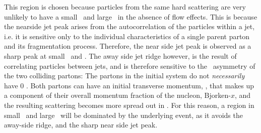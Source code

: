 This region is chosen because particles from the same hard scattering are very unlikely to have a small \deltaphi~and large \deltaeta~in the absence of flow effects. This is because the nearside jet peak arises from the autocorrelation of the particles within a jet, i.e. it is sensitive only to the individual characteristics of a single parent parton and its fragmentation process. Therefore, the near side jet peak is observed as a sharp peak at small \deltaphi~and \deltaeta. The away side jet ridge however, is the result of correlating particles between jets, and is therefore sensitive to the \kt~asymmetry of the two colliding partons: The partons in the initial system  do not \textit{necessarily} have 0 \pt. Both partons can have an initial transverse momentum, \kt, that makes up a component of their overall momentum fraction of the nucleon, Bjorken-$x$, and the resulting scattering becomes more spread out in \deltaeta. For this reason, a region in small \deltaphi~and large \deltaeta~will be dominated by the underlying event, as it avoids the away-side ridge, and the sharp near side jet peak.

